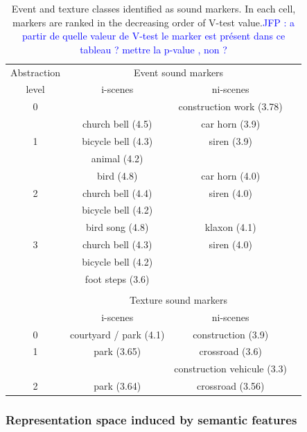 \documentclass[preprint,12pt]{elsarticle}
\newcommand{\jfp}[1]{\textcolor{blue}{JFP : #1}}
\begin{document}
\begin{table}[t]
 \setlength{\tabcolsep}{0.2pt}
 \centering
  {\renewcommand{\arraystretch}{0.9}
\begin{tabular}{c c c c}
Abstraction        & \multicolumn{2}{c}{Event sound markers} \\
level & i-scenes & ni-scenes \\
\hline
0  &                          & construction work (3.78)  \\
\hline
  & church bell  (4.5)             & car horn  (3.9) \\
1 & bicycle bell  (4.3)      & siren (3.9)\\
  & animal (4.2)              &       \\
   \hline
  & bird        (4.8)       & car horn  (4.0)\\
2 & church bell  (4.4)             & siren (4.0)\\
  & bicycle bell     (4.2)             &       \\
   \hline
  & bird song (4.8)        & klaxon  (4.1)\\
3 & church bell   (4.3)            & siren (4.0)\\
  & bicycle bell      (4.2)   &       \\
  & foot steps  (3.6)      &  \\
  &                           & \\
  & \multicolumn{2}{c}{Texture sound markers}      \\
  & i-scenes & ni-scenes \\
\hline
0 &     courtyard / park (4.1) &  construction (3.9)  \\
\hline
1 &     park (3.65)          &  crossroad (3.6)  \\
  &                          &  construction vehicule (3.3)  \\
\hline
2 &     park (3.64)          &  crossroad (3.56)  \\
\hline
\end{tabular}
}
\vspace{0.5mm}
\caption{Event and texture classes identified as sound markers. In each cell, markers are ranked in the decreasing order of V-test value.\jfp{a partir de quelle valeur de V-test le marker est présent dans ce tableau ? mettre la p-value , non ? }}
\label{tab:markers}
\end{table}

\subsubsection*{Representation space induced by semantic features}
\end{document}
